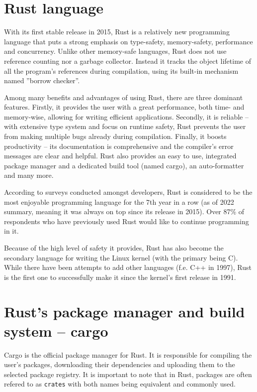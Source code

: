 \documentclass[licencjacka,en]{pracamgr}
\begin{document}
\section{Rust language}

With its first stable release in 2015, Rust is a relatively new programming language that
puts a strong emphasis on type-safety, memory-safety, performance and concurrency. Unlike
other memory-safe languages, Rust does not use reference counting nor a garbage collector.
Instead it tracks the object lifetime of all the program's references during compilation,
using its built-in mechanism named ''borrow checker''.

Among many benefits and advantages of using Rust, there are three dominant features. Firstly,
it provides the user with a great performance, both time- and memory-wise, allowing for
writing efficient applications. Secondly, it is reliable -- with extensive type system and
focus on runtime safety, Rust prevents the user from making multiple bugs
already during compilation. Finally, it boosts productivity -- its documentation is
comprehensive and the compiler's error messages are clear and helpful. Rust also provides
an easy to use, integrated package manager and a dedicated build tool (named cargo),
an auto-formatter and many more.

According to surveys conducted amongst developers, Rust is considered to be the most enjoyable
programming language for the 7th year in a row (as of 2022 summary, meaning it was always on top
since its release in 2015). Over 87\% of respondents who have previously used Rust would
like to continue programming in it.

Because of the high level of safety it provides, Rust has also become the secondary
language for writing the Linux kernel (with the primary being C). While there have been
attempts to add other languages (f.e. C++ in 1997), Rust is the first one to successfully
make it since the kernel's first release in 1991.

\section{Rust's package manager and build system -- cargo}

Cargo is the official package manager for Rust. It is responsible for compiling the user's
packages, downloading their dependencies and uploading them to the selected package registry.
It is important to note that in Rust, packages are often refered to as \texttt{crates} with both names
being equivalent and commonly used.
\end{document}
